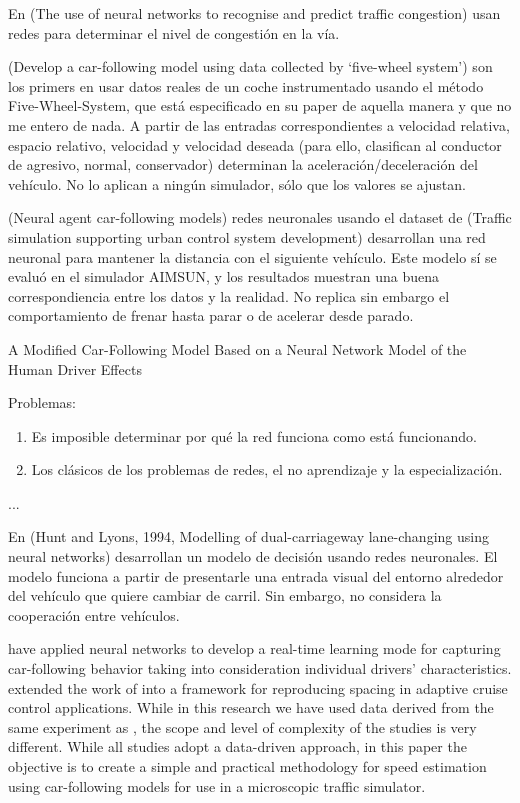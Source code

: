 En (The  use  of  neural  networks  to  recognise  and
predict traffic congestion) usan redes para determinar el nivel de congestión en la vía.

(Develop a car-following model using data collected by ‘five-wheel
system’) son los primers en usar datos reales de un coche instrumentado usando el método Five-Wheel-System, que está especificado en su paper de aquella manera y que no me entero de nada. A partir de las entradas correspondientes a velocidad relativa, espacio relativo, velocidad y velocidad deseada (para ello, clasifican al conductor de agresivo, normal, conservador) determinan la aceleración/deceleración del vehículo. No lo aplican a ningún simulador, sólo que los valores se ajustan.

(Neural agent car-following models) redes neuronales usando el dataset de (Traffic simulation supporting urban control system development) desarrollan una red neuronal para mantener la distancia con el siguiente vehículo. Este modelo sí se evaluó en el simulador AIMSUN, y los resultados muestran una buena correspondiencia entre los datos y la realidad. No replica sin embargo el comportamiento de frenar hasta parar o de acelerar desde parado.

A Modified Car-Following Model Based on a Neural Network Model of the Human Driver Effects


Problemas:

\begin{enumerate}
	\item Es imposible determinar por qué la red funciona como está funcionando.
	\item Los clásicos de los problemas de redes, el no aprendizaje y la especialización.
\end{enumerate}

...

En (Hunt and Lyons, 1994, Modelling of dual-carriageway lane-changing using neural networks) desarrollan un modelo de decisión usando redes neuronales. El modelo funciona a partir de presentarle una entrada visual del entorno alrededor del vehículo que quiere cambiar de carril. Sin embargo, no considera la cooperación entre vehículos.

\cite{Simonelli2009} have applied neural networks to develop a real-time learning mode for capturing car-following behavior taking into consideration individual drivers’ characteristics. \cite{Bifulco2014} extended the work of \cite{Simonelli2009} into a framework for reproducing spacing in adaptive cruise control applications. While in this research we have used data derived from the same experiment as \cite{Simonelli2009}, the scope and level of complexity of the studies is very different. While all studies adopt a data-driven approach, in this paper the objective is to create a simple and practical methodology for speed estimation using car-following models for use in a microscopic traffic simulator.

